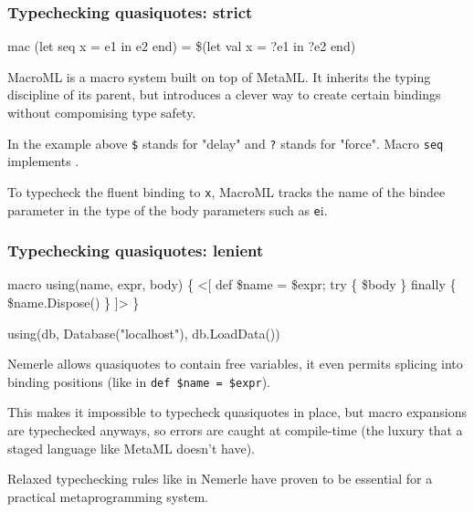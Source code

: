 \documentclass[hyperref={bookmarks=false}]{beamer}
\begin{document}
\begin{frame}[fragile]
\frametitle{Typechecking quasiquotes: strict}

\begin{lstlistinglike}
\begin{semiverbatim}
mac (let seq x = e1 in e2 end) =
   \$(let val x = ?e1 in ?e2 end)
\end{semiverbatim}
\end{lstlistinglike}

MacroML is a macro system built on top of MetaML. It inherits the typing discipline of its parent,
but introduces a clever way to create certain bindings without compomising type safety.

In the example above \texttt{\$} stands for "delay" and \texttt{?} stands for "force". Macro \texttt{seq}
implements \text{\color{red}{(wtf does it implement?)}}.

To typecheck the fluent binding to \texttt{x}, MacroML tracks the name of the bindee parameter in the type
of the body parameters such as \texttt{e}i.
\end{frame}

\begin{frame}[fragile]
\frametitle{Typechecking quasiquotes: lenient}

\begin{lstlistinglike}
\begin{semiverbatim}
macro using(name, expr, body) \{
  <[
    def \$name = \$expr;
    try \{ \$body \} finally \{ \$name.Dispose() \}
  ]>
\}

using(db, Database("localhost"), db.LoadData())
\end{semiverbatim}
\end{lstlistinglike}

Nemerle allows quasiquotes to contain free variables, it even permits
splicing into binding positions (like in \texttt{def \$name = \$expr}).

This makes it impossible to typecheck quasiquotes in place,
but macro expansions are typechecked anyways,
so errors are caught at compile-time
(the luxury that a staged language like MetaML doesn't have).

Relaxed typechecking rules like in Nemerle have proven to be essential
for a practical metaprogramming system.
\end{frame}
\end{document}
